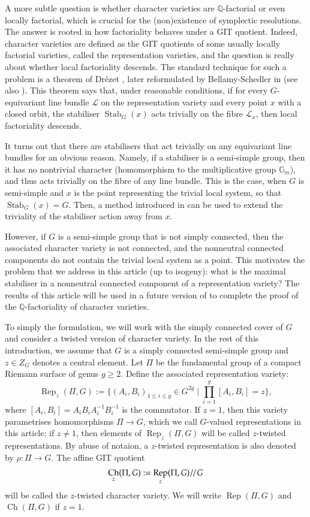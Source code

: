 \documentclass[11pt,oneside,dvipsnames]{amsart}
\theoremstyle{plain}
\theoremstyle{definition}
\theoremstyle{named}
\DeclareMathOperator{\Ch}{Ch}
\DeclareMathOperator{\Rep}{Rep}
\DeclareMathOperator{\Stab}{Stab}
\DeclareMathOperator{\ds}{\!/\mkern-2mu/\mkern-2mu}
\begin{document}
A more subtle question is whether character varieties are $\mathbb{Q}$-factorial or even locally factorial, which is crucial for the (non)existence of symplectic resolutions. The answer is rooted in how factoriality behaves under a GIT quotient. Indeed, character varieties are defined as the GIT quotients of some usually locally factorial varieties, called the representation varieties, and the question is really about whether local factoriality descends. The standard technique for such a problem is a theorem of Dr\'ezet \cite{Dre1}, later reformulated by Bellamy-Schedler in \cite{BS0} (see also \cite{Shu4}). This theorem says that, under reasonable conditions, if for every $G$-equivariant line bundle $\mathcal{L}$ on the representation variety and every point $x$ with a closed orbit, the stabiliser $\Stab_G(x)$ acts trivially on the fibre $\mathcal{L}_x$, then local factoriality descends. 

It turns out that there are stabilisers that act trivially on any equivariant line bundles for an obvious reason. Namely, if a stabiliser is a semi-simple group, then it has no nontrivial character (homomorphism to the multiplicative group $\mathbb{G}_m$), and thus acts trivially on the fibre of any line bundle. This is the case, when $G$ is semi-simple and $x$ is the point representing the trivial local system, so that $\Stab_G(x)=G$. Then, a method introduced in \cite{KLS} can be used to extend the triviality of the stabiliser action away from $x$. 

However, if $G$ is a semi-simple group that is not simply connected, then the associated character variety is not connected, and the nonneutral connected components do not contain the trivial local system as a point. This motivates the problem that we address in this article (up to isogeny): what is the maximal stabiliser in a nonneutral connected component of a representation variety? The results of this article will be used in a future version of \cite{Shu4} to complete the proof of the $\mathbb{Q}$-factoriality of character varieties.

To simply the formulation, we will work with the simply connected cover of $G$ and consider a twisted version of character variety. In the rest of this introduction, we assume that $G$ is a simply connected semi-simple group and $z\in Z_G$ denotes a central element. Let $\Pi$ be the fundamental group of a compact Riemann surface of genus $g\ge 2$. Define the associated representation variety:
$$
\Rep_z(\Pi,G):=\{(A_i,B_i)_{1\le i\le g}\in G^{2g}\mid \prod_{i=1}^g[A_i,B_i]=z\},
$$
where $[A_i,B_i]=A_iB_iA_i^{-1}B_i^{-1}$ is the commutator. If $z=1$, then this variety parametrises homomorphisms $\Pi\rightarrow G$, which we call $G$-valued representations in this article; if $z\ne 1$, then elements of $\Rep_z(\Pi,G)$ will be called $z$-twisted representations. By abuse of notaion, a $z$-twisted representation is also denoted by $\rho:\Pi\rightarrow G$. The affine GIT quotient
$$
\Ch_z(\Pi,G):=\Rep_z(\Pi,G)\ds G
$$
will be called the $z$-twisted character variety. We will write $\Rep(\Pi,G)$ and $\Ch(\Pi,G)$ if $z=1$.
\end{document}
